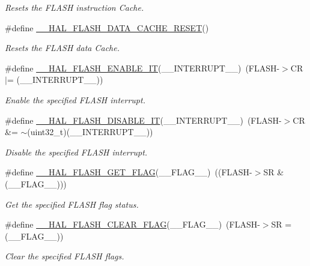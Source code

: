 \begin{DoxyCompactItemize}
\begin{DoxyCompactList}\small\item\em Resets the F\+L\+A\+SH instruction Cache. \end{DoxyCompactList}\item 
\#define \hyperlink{group___f_l_a_s_h___exported___macros_ga3b94f4f103ddab361802c8defd3a9c34}{\+\_\+\+\_\+\+H\+A\+L\+\_\+\+F\+L\+A\+S\+H\+\_\+\+D\+A\+T\+A\+\_\+\+C\+A\+C\+H\+E\+\_\+\+R\+E\+S\+ET}()
\begin{DoxyCompactList}\small\item\em Resets the F\+L\+A\+SH data Cache. \end{DoxyCompactList}\item 
\#define \hyperlink{group___f_l_a_s_h___exported___macros_ga13fa137a911f02a2f94fb9fb0762a340}{\+\_\+\+\_\+\+H\+A\+L\+\_\+\+F\+L\+A\+S\+H\+\_\+\+E\+N\+A\+B\+L\+E\+\_\+\+IT}(\+\_\+\+\_\+\+I\+N\+T\+E\+R\+R\+U\+P\+T\+\_\+\+\_\+)~(F\+L\+A\+SH-\/$>$CR $\vert$= (\+\_\+\+\_\+\+I\+N\+T\+E\+R\+R\+U\+P\+T\+\_\+\+\_\+))
\begin{DoxyCompactList}\small\item\em Enable the specified F\+L\+A\+SH interrupt. \end{DoxyCompactList}\item 
\#define \hyperlink{group___f_l_a_s_h___exported___macros_ga1f40f507b5d4b3a4da68e4244a1097ee}{\+\_\+\+\_\+\+H\+A\+L\+\_\+\+F\+L\+A\+S\+H\+\_\+\+D\+I\+S\+A\+B\+L\+E\+\_\+\+IT}(\+\_\+\+\_\+\+I\+N\+T\+E\+R\+R\+U\+P\+T\+\_\+\+\_\+)~(F\+L\+A\+SH-\/$>$CR \&= $\sim$(uint32\+\_\+t)(\+\_\+\+\_\+\+I\+N\+T\+E\+R\+R\+U\+P\+T\+\_\+\+\_\+))
\begin{DoxyCompactList}\small\item\em Disable the specified F\+L\+A\+SH interrupt. \end{DoxyCompactList}\item 
\#define \hyperlink{group___f_l_a_s_h___exported___macros_ga0d3dd161fecc0e47c9e109c7c28672c1}{\+\_\+\+\_\+\+H\+A\+L\+\_\+\+F\+L\+A\+S\+H\+\_\+\+G\+E\+T\+\_\+\+F\+L\+AG}(\+\_\+\+\_\+\+F\+L\+A\+G\+\_\+\+\_\+)~((F\+L\+A\+SH-\/$>$SR \& (\+\_\+\+\_\+\+F\+L\+A\+G\+\_\+\+\_\+)))
\begin{DoxyCompactList}\small\item\em Get the specified F\+L\+A\+SH flag status. \end{DoxyCompactList}\item 
\#define \hyperlink{group___f_l_a_s_h___exported___macros_ga68e49c4675761e2ec35153e747de7622}{\+\_\+\+\_\+\+H\+A\+L\+\_\+\+F\+L\+A\+S\+H\+\_\+\+C\+L\+E\+A\+R\+\_\+\+F\+L\+AG}(\+\_\+\+\_\+\+F\+L\+A\+G\+\_\+\+\_\+)~(F\+L\+A\+SH-\/$>$SR = (\+\_\+\+\_\+\+F\+L\+A\+G\+\_\+\+\_\+))
\begin{DoxyCompactList}\small\item\em Clear the specified F\+L\+A\+SH flags. \end{DoxyCompactList}\end{DoxyCompactItemize}


